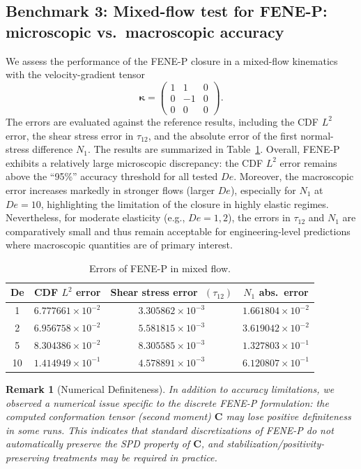 \documentclass[preprint,12pt]{elsarticle}
\newtheorem{remark}{Remark}[section]
\begin{document}
\subsection{Benchmark 3: Mixed-flow test for FENE-P: microscopic vs.\ macroscopic accuracy}
We assess the performance of the FENE-P closure in a mixed-flow kinematics with the velocity-gradient tensor
\[
\boldsymbol{\kappa}=
\begin{pmatrix}
1 & 1 & 0\\
0 & -1 & 0\\
0 & 0 & 0
\end{pmatrix}.
\]
The errors are evaluated against the reference results, including the CDF \(L^2\) error, the shear stress error in \(\tau_{12}\), and the absolute error of the first normal-stress difference \(N_1\). The results are summarized in Table~\ref{tab:mixedflow_fenep_error}.
Overall, FENE-P exhibits a relatively large microscopic discrepancy: the CDF \(L^2\) error remains above the ``95\%'' accuracy threshold for all tested \(De\). Moreover, the macroscopic error increases markedly in stronger flows (larger \(De\)), especially for \(N_1\) at \(De=10\), highlighting the limitation of the closure in highly elastic regimes. Nevertheless, for moderate elasticity (e.g., \(De=1,2\)), the errors in \(\tau_{12}\) and \(N_1\) are comparatively small and thus remain acceptable for engineering-level predictions where macroscopic quantities are of primary interest.

\begin{table}[t]
\centering
\caption{Errors of FENE-P in mixed flow.}
\label{tab:mixedflow_fenep_error}
\begin{tabular}{c c c c}
\toprule
De & CDF \(L^2\) error & Shear stress error \(\;(\tau_{12})\) & \(N_1\) abs.\ error \\
\midrule
1  & \(6.777661\times10^{-2}\) & \(3.305862\times10^{-3}\) & \(1.661804\times10^{-2}\) \\
2  & \(6.956758\times10^{-2}\) & \(5.581815\times10^{-3}\) & \(3.619042\times10^{-2}\) \\
5  & \(8.304386\times10^{-2}\) & \(8.305585\times10^{-3}\) & \(1.327803\times10^{-1}\) \\
10 & \(1.414949\times10^{-1}\) & \(4.578891\times10^{-3}\) & \(6.120807\times10^{-1}\) \\
\bottomrule
\end{tabular}
\end{table}

\begin{remark}[Numerical Definiteness]
In addition to accuracy limitations, we observed a numerical issue specific to the discrete FENE-P formulation: the computed conformation tensor (second moment) \(\mathbf C\) may lose positive definiteness in some runs. This indicates that standard discretizations of FENE-P do not automatically preserve the SPD property of \(\mathbf C\), and stabilization/positivity-preserving treatments may be required in practice.
\end{remark}
\end{document}
